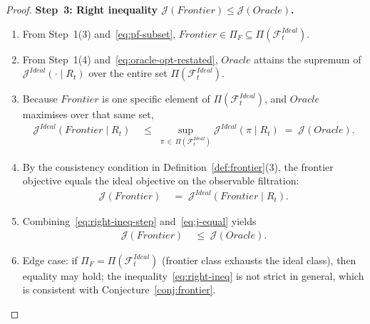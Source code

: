 \documentclass[12pt,openany]{book}
\numberwithin{equation}{chapter}
\theoremstyle{plain}
\theoremstyle{definition}
\theoremstyle{remark}
\numberwithin{equation}{chapter}
\theoremstyle{plain}
\newcommand{\Ideal}{\mathcal{E}_{I}}
\newcommand{\Oracle}{O}
\newcommand{\Frontier}{F}
\def\Oracle{Oracle}%
\def\Ideal{Ideal}%
\def\Frontier{Frontier}%
\begin{document}
\begin{proof}
\medskip
\noindent\textbf{Step~3: Right inequality
$\mathcal{J}(\Frontier) \leq \mathcal{J}(\Oracle)$.}
\begin{enumerate}
  \item From Step~1(3) and~\eqref{eq:pf-subset},
        $\Frontier \in \Pi_F \subseteq
        \Pi(\mathcal{F}_t^{\Ideal})$.
  \item From Step~1(4) and~\eqref{eq:oracle-opt-restated},
        $\Oracle$ attains the supremum of
        $\mathcal{J}^{\Ideal}(\cdot \mid R_t)$ over the
        entire set $\Pi(\mathcal{F}_t^{\Ideal})$.
  \item Because $\Frontier$ is one specific element of
        $\Pi(\mathcal{F}_t^{\Ideal})$, and $\Oracle$
        maximises over that same set,
        \begin{align}
          \mathcal{J}^{\Ideal}(\Frontier \mid R_t)
          &\;\leq\;
          \sup_{\pi\,\in\,\Pi(\mathcal{F}_t^{\Ideal})}
          \mathcal{J}^{\Ideal}(\pi \mid R_t)
          \;=\;
          \mathcal{J}(\Oracle).
          \label{eq:right-ineq-step}
        \end{align}
  \item By the consistency condition in
        Definition~\ref{def:frontier}(3), the frontier
        objective equals the ideal objective on the
        observable filtration:
        \begin{align}
          \mathcal{J}(\Frontier)
          &\;=\;
          \mathcal{J}^{\Ideal}(\Frontier \mid R_t).
          \label{eq:j-equal}
        \end{align}
  \item Combining~\eqref{eq:right-ineq-step}
        and~\eqref{eq:j-equal} yields
        \begin{align}
          \mathcal{J}(\Frontier)
          &\;\leq\;
          \mathcal{J}(\Oracle).
          \label{eq:right-ineq}
        \end{align}
  \item Edge case: if $\Pi_F = \Pi(\mathcal{F}_t^{\Ideal})$
        (frontier class exhausts the ideal class), then
        equality may hold; the inequality~\eqref{eq:right-ineq}
        is not strict in general, which is consistent with
        Conjecture~\ref{conj:frontier}.
\end{enumerate}


\end{proof}
\end{document}
